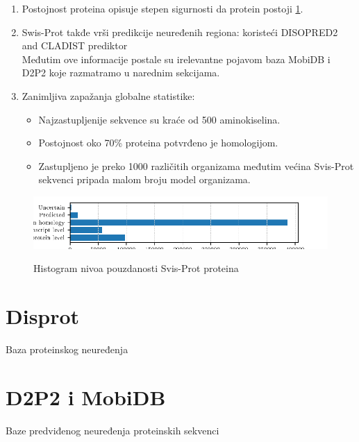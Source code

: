 \begin{enumerate}
  \item Postojnost proteina   opisuje stepen
    sigurnosti da protein postoji \ref{fig:PE}.

  \clearpage


  \item
    Swis-Prot takđe vrši predikcije neuređenih regiona:  koristeći DISOPRED2
    and CLADIST prediktor \parencite{meng_c2017}\\ Međutim ove informacije
    postale su irelevantne pojavom baza MobiDB i D2P2 koje razmatramo u
    narednim sekcijama.

  \item Zanimljiva zapažanja globalne statistike:
    \begin{itemize}
      \item Najzastupljenije sekvence su kraće od 500 aminokiselina.
      \item Postojnost oko 70\% proteina potvrđeno je homologijom.
      \item Zastupljeno je preko 1000 različitih organizama međutim
        većina Svis-Prot sekvenci pripada malom broju model organizama.
    \end{itemize}
      


\end{enumerate}

\begin{figure}[h!]
  \centering
  \includegraphics[]{plots/PE.pdf}
  \label{fig:PE}
  \caption{Histogram nivoa pouzdanosti Svis-Prot proteina}
\end{figure}

\section{Disprot}

Baza proteinskog neuređenja 

\section{D2P2 i MobiDB}

Baze predviđenog neuređenja proteinskih sekvenci


